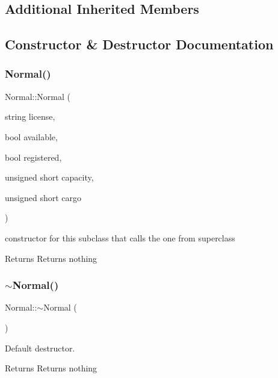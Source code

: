 \subsection*{Additional Inherited Members}


\subsection{Constructor \& Destructor Documentation}
\mbox{\label{class_normal_a5bfcd1d763c6cf56bdcf4de370903da7}} 
\subsubsection{\texorpdfstring{Normal()}{Normal()}}
{\footnotesize\ttfamily Normal\+::\+Normal (\begin{DoxyParamCaption}\item[{string}]{license,  }\item[{bool}]{available,  }\item[{bool}]{registered,  }\item[{unsigned short}]{capacity,  }\item[{unsigned short}]{cargo }\end{DoxyParamCaption})}



constructor for this subclass that calls the one from superclass 

\begin{DoxyReturn}{Returns}
Returns nothing 
\end{DoxyReturn}
\mbox{\label{class_normal_a2ed547e3b7361c3675224d352cf79740}} 
\subsubsection{\texorpdfstring{$\sim$\+Normal()}{~Normal()}}
{\footnotesize\ttfamily Normal\+::$\sim$\+Normal (\begin{DoxyParamCaption}{ }\end{DoxyParamCaption})\hspace{0.3cm}{\ttfamily [inline]}}



Default destructor. 

\begin{DoxyReturn}{Returns}
Returns nothing 
\end{DoxyReturn}


